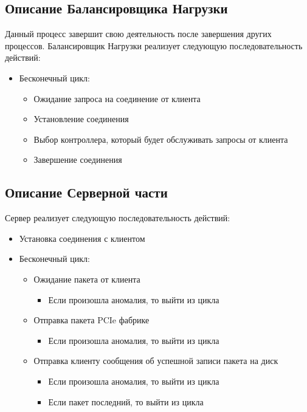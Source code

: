 \subsection{Описание Балансировщика Нагрузки}
Данный процесс завершит свою деятельность после завершения других процессов. Балансировщик Нагрузки реализует следующую последовательность действий: 

\begin{itemize}

\item Бесконечный цикл:
	\begin{itemize}
		\item Ожидание запроса на соединение от клиента
		\item Установление соединения
		\item Выбор контроллера, который будет обслуживать запросы от клиента
		\item  Завершение соединения
	\end{itemize}
\end{itemize}

\subsection{Описание Серверной части}

Сервер реализует следующую последовательность действий: 

\begin{itemize}
\item Установка соединения с клиентом
\item Бесконечный цикл:
	\begin{itemize}
		\item Ожидание пакета от клиента
		\begin{itemize}
			\item Если произошла аномалия, то выйти из цикла
		\end{itemize}
		
		\item Отправка пакета PCIe фабрике
		\begin{itemize}
			\item Если произошла аномалия, то выйти из цикла
		\end{itemize}		
		\item  Отправка клиенту сообщения об успешной записи пакета на диск 
		\begin{itemize}
			\item Если произошла аномалия, то выйти из цикла
		\end{itemize}
		\begin{itemize}
			\item Если пакет последний, то выйти из цикла
		\end{itemize}
	\end{itemize}
\end{itemize}

